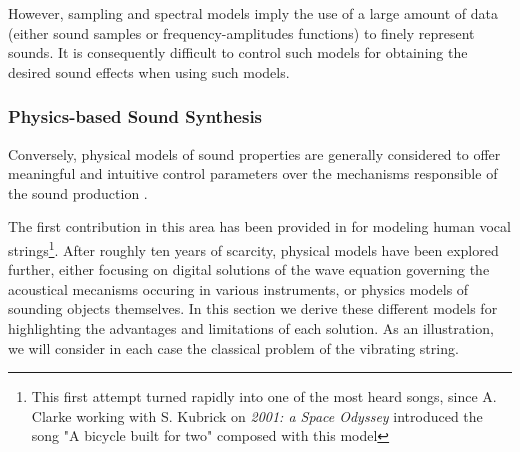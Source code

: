 {{However, sampling and spectral models imply the use of a large amount of data (either sound samples or frequency-amplitudes functions) to finely represent sounds. It is consequently difficult to control such models for obtaining the desired sound effects when using such models.


			\subsubsection{Physics-based Sound Synthesis}
			\label{subsubsec:CM_SS_Physics}

Conversely, physical models of sound properties are generally considered to offer meaningful and intuitive control parameters over the mechanisms responsible of the sound production .

The first contribution in this area has been provided in  for modeling human vocal strings\footnote{This first attempt turned rapidly into one of the most heard songs, since A. Clarke working with S. Kubrick on \emph{2001: a Space Odyssey} introduced the song "A bicycle built for two" composed with this model }. After roughly ten years of scarcity, physical models have been explored further, either focusing on digital solutions of the wave equation governing the acoustical mecanisms occuring in various instruments, or physics models of sounding objects themselves. In this section we derive these different models for highlighting the advantages and limitations of each solution. As an illustration, we will consider in each case the classical problem of the vibrating string.







}}
